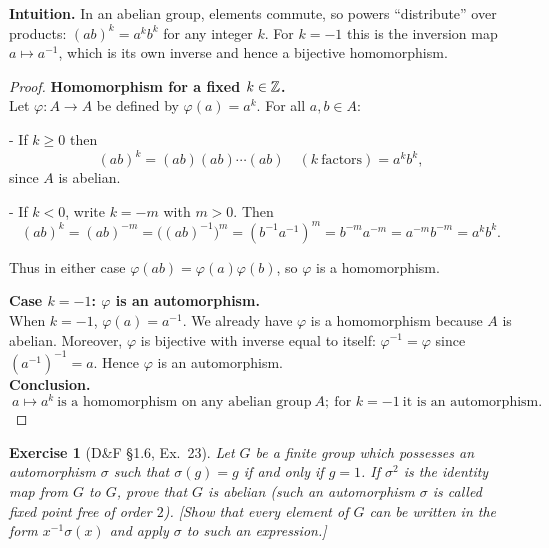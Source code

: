 \documentclass[12pt]{article}
\newtheorem{exercise}[theorem]{Exercise}
\theoremstyle{definition}
\begin{document}
\dotfill

\noindent\textbf{Intuition.}
In an abelian group, elements commute, so powers “distribute” over products: $(ab)^{k}=a^{k}b^{k}$ for any integer $k$. For $k=-1$ this is the inversion map $a\mapsto a^{-1}$, which is its own inverse and hence a bijective homomorphism.\\

\dotfill

\begin{proof}
\noindent\textbf{Homomorphism for a fixed $k\in\Bbb Z$.}\\
Let $\varphi:A\to A$ be defined by $\varphi(a)=a^{k}$.  
For all $a,b\in A$:

- If $k\ge 0$ then
\[
(ab)^k = (ab)(ab)\cdots(ab) \quad (k\ \text{factors})
= a^k b^k,
\]
since $A$ is abelian.

- If $k<0$, write $k=-m$ with $m>0$. Then
\[
(ab)^k = (ab)^{-m} = \big((ab)^{-1}\big)^m
= (b^{-1}a^{-1})^m = b^{-m}a^{-m}=a^{-m}b^{-m}=a^k b^k.
\]

Thus in either case $\varphi(ab)=\varphi(a)\varphi(b)$, so $\varphi$ is a homomorphism.


\noindent\textbf{Case $k=-1$: $\varphi$ is an automorphism.}\\
\noindent When $k=-1$, $\varphi(a)=a^{-1}$. We already have $\varphi$ is a homomorphism because $A$ is abelian. Moreover, $\varphi$ is bijective with inverse equal to itself: $\varphi^{-1}=\varphi$ since $(a^{-1})^{-1}=a$. Hence $\varphi$ is an automorphism.\\

\noindent\textbf{Conclusion.}
\[
\boxed{\ a\mapsto a^{k}\ \text{is a homomorphism on any abelian group}\ A;\ \text{for }k=-1\ \text{it is an automorphism}.\ }
\]
\end{proof}

\newpage

\begin{exercise}[D\&F §1.6, Ex.~23]
Let $G$ be a finite group which possesses an automorphism $\sigma$ such that
$\sigma(g)=g$ if and only if $g=1$. If $\sigma^{2}$ is the identity map from $G$ to $G$, prove that $G$ is
abelian (such an automorphism $\sigma$ is called fixed point free of order $2$). [Show that every
element of $G$ can be written in the form $x^{-1}\sigma(x)$ and apply $\sigma$ to such an expression.]
\end{exercise}

\dotfill
\end{document}
